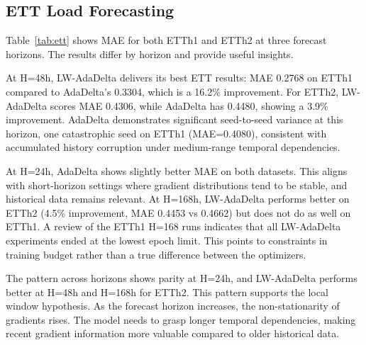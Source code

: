 \documentclass[11pt,a4paper]{article}
\begin{document}
\subsection{ETT Load Forecasting}

Table~\ref{tab:ett} shows MAE for both ETTh1 and ETTh2 at three forecast horizons. The results differ by horizon and provide useful insights.

At H=48h, LW-AdaDelta delivers its best ETT results: MAE 0.2768 on ETTh1 compared to AdaDelta's 0.3304, which is a 16.2\% improvement. For ETTh2, LW-AdaDelta scores MAE 0.4306, while AdaDelta has 0.4480, showing a 3.9\% improvement. AdaDelta demonstrates significant seed-to-seed variance at this horizon, one catastrophic seed on ETTh1 (MAE=0.4080), consistent with accumulated history corruption under medium-range temporal dependencies.

At H=24h, AdaDelta shows slightly better MAE on both datasets. This aligns with short-horizon settings where gradient distributions tend to be stable, and historical data remains relevant. At H=168h, LW-AdaDelta performs better on ETTh2 (4.5\% improvement, MAE 0.4453 vs 0.4662) but does not do as well on ETTh1. A review of the ETTh1 H=168 runs indicates that all LW-AdaDelta experiments ended at the lowest epoch limit. This points to constraints in training budget rather than a true difference between the optimizers.

The pattern across horizons shows parity at H=24h, and LW-AdaDelta performs better at H=48h and H=168h for ETTh2. This pattern supports the local window hypothesis. As the forecast horizon increases, the non-stationarity of gradients rises. The model needs to grasp longer temporal dependencies, making recent gradient information more valuable compared to older historical data.
\end{document}
